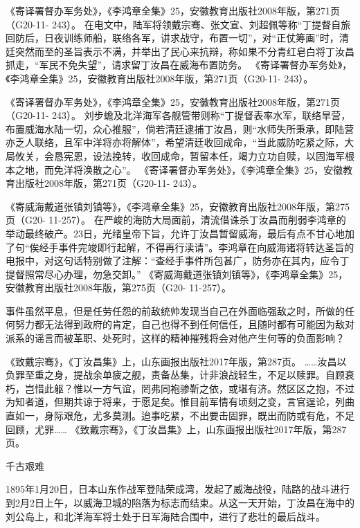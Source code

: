 \documentclass[12pt,UTF8]{ctexbook}
\begin{document}
《寄译署督办军务处》，《李鸿章全集》25，安徽教育出版社2008年版，第271页（G20-11- 243）。
在电文中，陆军将领戴宗骞、张文宣、刘超佩等称“丁提督自旅回防后，日夜训练师船，联络各军，讲求战守，布置一切”，对“正仗筹画”时，清廷突然而至的圣旨表示不满，并举出了民心来抗辩，称如果不分青红皂白将丁汝昌抓走，“军民不免失望”，请求留丁汝昌在威海布置防务。 《寄译署督办军务处》，《李鸿章全集》25，安徽教育出版社2008年版，第271页（G20-11- 243）。

《寄译署督办军务处》，《李鸿章全集》25，安徽教育出版社2008年版，第271页（G20-11- 243）。
刘步蟾及北洋海军各舰管带则称“丁提督表率水军，联络旱营，布置威海水陆一切，众心推服”，倘若清廷逮捕丁汝昌，则“水师失所秉承，即陆营亦乏人联络，且军中洋将亦将解体”，希望清廷收回成命，“当此威防吃紧之际，大局攸关，会恳宪恩，设法挽转，收回成命，暂留本任，竭力立功自赎，以固海军根本之地，而免洋将涣散之心”。 《寄译署督办军务处》，《李鸿章全集》25，安徽教育出版社2008年版，第271页（G20-11- 243）。

《寄威海戴道张镇刘镇等》，《李鸿章全集》25，安徽教育出版社2008年版，第275页（G20- 11-257）。
在严峻的海防大局面前，清流借诛杀丁汝昌而削弱李鸿章的举动最终破产。23日，光绪皇帝下旨，允许丁汝昌暂留威海，最后有点不甘心地加了句“俟经手事件完竣即行起解，不得再行渎请”。李鸿章在向威海诸将转达圣旨的电报中，对这句话特别做了注解：“查经手事件所包甚广，防务亦在其内，应令丁提督照常尽心办理，勿急交卸。” 《寄威海戴道张镇刘镇等》，《李鸿章全集》25，安徽教育出版社2008年版，第275页（G20- 11-257）。

事件虽然平息，但是任劳任怨的前敌统帅发现当自己在外面临强敌之时，所做的任何努力都无法得到政府的肯定，自己也得不到任何信任，且随时都有可能因为敌对派系的谣言而被革职、处死时，这样的精神摧残将会对他产生何等的负面影响？

《致戴宗骞》，《丁汝昌集》上，山东画报出版社2017年版，第287页。
……汝昌以负罪至重之身，提战余单疲之舰，责备丛集，计非浪战轻生，不足以赎罪。自顾衰朽，岂惜此躯？惟以一方气谊，罔弗同袍骖靳之依，或堪有济。然区区之抱，不过为知者道，但期共谅于将来，于愿足矣。惟目前军情有顷刻之变，言官逞论，列曲直如一，身际艰危，尤多莫测。迨事吃紧，不出要击固罪，既出而防或有危，不足回顾，尤罪…… 《致戴宗骞》，《丁汝昌集》上，山东画报出版社2017年版，第287页。

千古艰难

1895年1月20日，日本山东作战军登陆荣成湾，发起了威海战役，陆路的战斗进行到2月2日上午，以威海卫城的陷落为标志而结束。从这一天开始，丁汝昌在海中的刘公岛上，和北洋海军将士处于日军海陆合围中，进行了悲壮的最后战斗。
\end{document}
